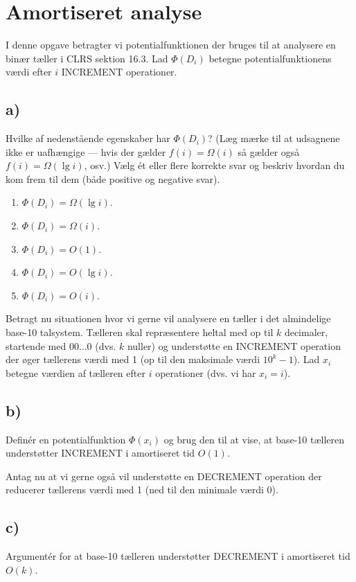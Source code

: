 \documentclass{article}
\theoremstyle{definition}
\begin{document}
\section{Amortiseret analyse}

I denne opgave betragter vi potentialfunktionen der bruges til at analysere en binær tæller i CLRS sektion 16.3. Lad $\Phi(D_i)$ betegne potentialfunktionens værdi efter $i$ INCREMENT operationer.

\subsection*{a)} Hvilke af nedenstående egenskaber har $\Phi(D_i)$? (Læg mærke til at udsagnene ikke er uafhængige --- hvis der gælder $f(i) = \Omega(i)$ så gælder også $f(i) = \Omega(\lg i)$, osv.) Vælg ét eller flere korrekte svar og beskriv hvordan du kom frem til dem (både positive og negative svar).

\begin{enumerate}
    \item $\Phi(D_i) = \Omega(\lg i)$.
    \item $\Phi(D_i) = \Omega(i)$.
    \item $\Phi(D_i) = O(1)$.
    \item $\Phi(D_i) = O(\lg i)$.
    \item $\Phi(D_i) = O(i)$.
\end{enumerate}

Betragt nu situationen hvor vi gerne vil analysere en tæller i det almindelige base-10 talsystem. Tælleren skal repræsentere heltal med op til $k$ decimaler, startende med $00\ldots0$ (dvs. $k$ nuller) og understøtte en INCREMENT operation der øger tællerens værdi med 1 (op til den maksimale værdi $10^k - 1$). Lad $x_i$ betegne værdien af tælleren efter $i$ operationer (dvs. vi har $x_i = i$).

\subsection*{b)} Definér en potentialfunktion $\Phi(x_i)$ og brug den til at vise, at base-10 tælleren understøtter INCREMENT i amortiseret tid $O(1)$.

Antag nu at vi gerne også vil understøtte en DECREMENT operation der reducerer tællerens værdi med 1 (ned til den minimale værdi 0).

\subsection*{c)} Argumentér for at base-10 tælleren understøtter DECREMENT i amortiseret tid $O(k)$.
\end{document}
